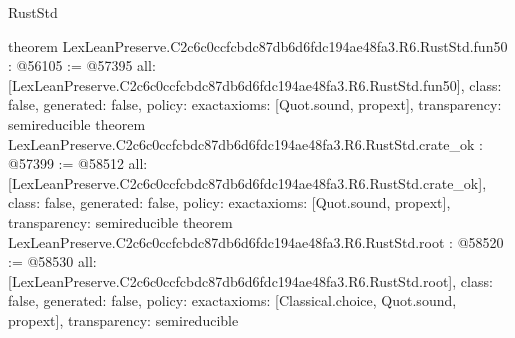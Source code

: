 \begin{lexlean}{RustStd}
\begin{coremodule}
{}
theorem LexLeanPreserve.C2c6c0ccfcbdc87db6d6fdc194ae48fa3.R6.RustStd.fun50 : @56105 := @57395 {
  all: [LexLeanPreserve.C2c6c0ccfcbdc87db6d6fdc194ae48fa3.R6.RustStd.fun50],
  class: false,
  generated: false,
  policy: exact{axioms: [Quot.sound, propext]},
  transparency: semireducible
}
theorem LexLeanPreserve.C2c6c0ccfcbdc87db6d6fdc194ae48fa3.R6.RustStd.crate_ok : @57399 := @58512 {
  all: [LexLeanPreserve.C2c6c0ccfcbdc87db6d6fdc194ae48fa3.R6.RustStd.crate_ok],
  class: false,
  generated: false,
  policy: exact{axioms: [Quot.sound, propext]},
  transparency: semireducible
}
theorem LexLeanPreserve.C2c6c0ccfcbdc87db6d6fdc194ae48fa3.R6.RustStd.root : @58520 := @58530 {
  all: [LexLeanPreserve.C2c6c0ccfcbdc87db6d6fdc194ae48fa3.R6.RustStd.root],
  class: false,
  generated: false,
  policy: exact{axioms: [Classical.choice, Quot.sound, propext]},
  transparency: semireducible
}


\end{coremodule}
\end{lexlean}
